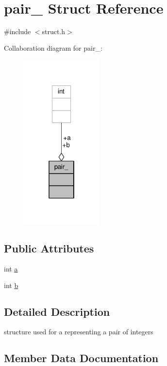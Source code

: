 \hypertarget{structpair__}{}\section{pair\+\_\+ Struct Reference}
\label{structpair__}


{\ttfamily \#include $<$struct.\+h$>$}



Collaboration diagram for pair\+\_\+\+:
\nopagebreak
\begin{figure}[H]
\begin{center}
\leavevmode
\includegraphics[width=118pt]{structpair____coll__graph}
\end{center}
\end{figure}
\subsection*{Public Attributes}
\begin{DoxyCompactItemize}
\item 
int \hyperlink{structpair___a34b3976aedfeaae0572bf95f1f3ac47f}{a}
\item 
int \hyperlink{structpair___a1ede8bd28d7cadae8ddf1ff155482737}{b}
\end{DoxyCompactItemize}


\subsection{Detailed Description}
structure used for a representing a pair of integers 

\subsection{Member Data Documentation}
\mbox{\label{structpair___a34b3976aedfeaae0572bf95f1f3ac47f}} 
